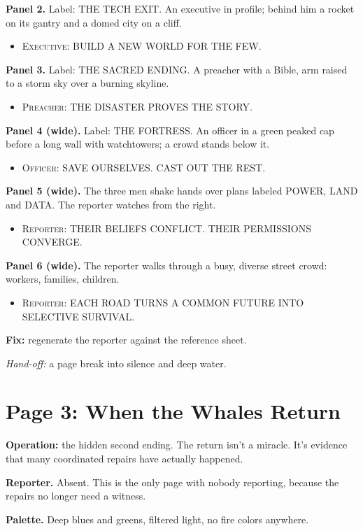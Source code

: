 \documentclass[11pt]{article}
\newcommand{\op}[1]{\textbf{Operation:} #1\par}
\newcommand{\panel}[2]{\textbf{#1.} #2\par}
\newenvironment{lines}{\begin{itemize}[label={},leftmargin=1.5em,itemsep=0.05em,topsep=0.1em]}{\end{itemize}}
\newcommand{\say}[2]{\item \textsc{#1}: \textsf{\small #2}}
\newcommand{\fix}[1]{\textcolor{tractred}{\textbf{Fix:}} #1\par}
\newcommand{\handoff}[1]{\emph{Hand-off:} #1\par}
\begin{document}
\panel{Panel 2}{Label: \textsf{\small THE TECH EXIT}. An executive in profile; behind him a rocket on its gantry and a domed city on a cliff.}
\begin{lines}\say{Executive}{BUILD A NEW WORLD FOR THE FEW.}\end{lines}

\panel{Panel 3}{Label: \textsf{\small THE SACRED ENDING}. A preacher with a Bible, arm raised to a storm sky over a burning skyline.}
\begin{lines}\say{Preacher}{THE DISASTER PROVES THE STORY.}\end{lines}

\panel{Panel 4 (wide)}{Label: \textsf{\small THE FORTRESS}. An officer in a green peaked cap before a long wall with watchtowers; a crowd stands below it.}
\begin{lines}\say{Officer}{SAVE OURSELVES. CAST OUT THE REST.}\end{lines}

\panel{Panel 5 (wide)}{The three men shake hands over plans labeled \textsf{\small POWER}, \textsf{\small LAND} and \textsf{\small DATA}. The reporter watches from the right.}
\begin{lines}\say{Reporter}{THEIR BELIEFS CONFLICT. THEIR PERMISSIONS CONVERGE.}\end{lines}

\panel{Panel 6 (wide)}{The reporter walks through a busy, diverse street crowd: workers, families, children.}
\begin{lines}\say{Reporter}{EACH ROAD TURNS A COMMON FUTURE INTO SELECTIVE SURVIVAL.}\end{lines}

\fix{regenerate the reporter against the reference sheet.}
\handoff{a page break into silence and deep water.}

\section{Page 3: When the Whales Return}

\op{the hidden second ending. The return isn't a miracle. It's evidence that many coordinated repairs have actually happened.}

\textbf{Reporter.} Absent. This is the only page with nobody reporting, because the repairs no longer need a witness.

\textbf{Palette.} Deep blues and greens, filtered light, no fire colors anywhere.
\end{document}
